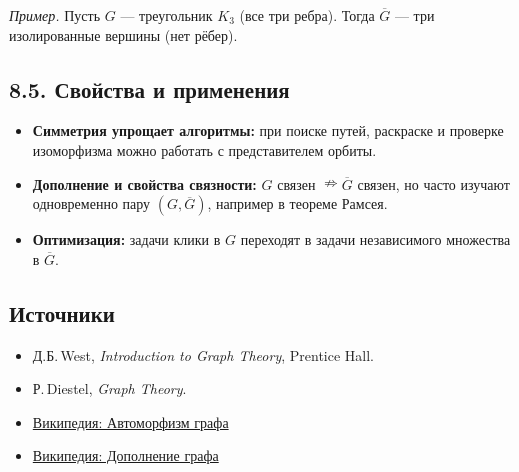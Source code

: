 \documentclass{article}
\begin{document}
\begin{center}
\end{center}

\emph{Пример.} Пусть $G$ — треугольник $K_3$ (все три ребра). Тогда $\overline{G}$ — три изолированные вершины (нет рёбер).

\subsection*{8.5. Свойства и применения}

\begin{itemize}[leftmargin=*]
  \item \textbf{Симметрия упрощает алгоритмы:} при поиске путей, раскраске и проверке изоморфизма можно работать с представителем орбиты.
  \item \textbf{Дополнение и свойства связности:} $G$ связен $\nRightarrow \overline G$ связен, но часто изучают одновременно пару $(G,\overline G)$, например в теореме Рамсея.
  \item \textbf{Оптимизация:} задачи клики в $G$ переходят в задачи независимого множества в $\overline G$.
\end{itemize}

\subsection*{Источники}

\begin{itemize}
  \item Д.Б.\,West, \emph{Introduction to Graph Theory}, Prentice Hall.
  \item Р.\,Diestel, \emph{Graph Theory}.
  \item \href{https://ru.wikipedia.org/wiki/Автоморфизм_графа}{Википедия: Автоморфизм графа}
  \item \href{https://ru.wikipedia.org/wiki/Дополнение_графа}{Википедия: Дополнение графа}
\end{itemize}
\end{document}
